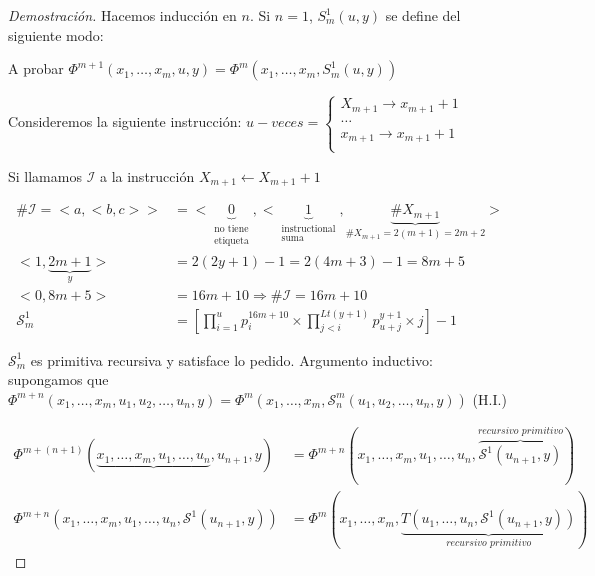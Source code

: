 \begin{proof}[Demostraci\'on]
Hacemos inducci\'on en $n$. Si $n = 1$, $S^{1}_{m}(u, y)$ se define del siguiente modo:

A probar $\Phi^{m + 1}(x_1, \ldots, x_m, u, y) = \Phi^{m}(x_1, \ldots, x_m, S^{1}_{m}(u, y))$

Consideremos la siguiente instrucci\'on:
\( u-veces =
\begin{cases}
X_{m + 1} \rightarrow x_{m + 1} + 1			\\
\ldots										\\
x_{m + 1} \rightarrow x_{m + 1} + 1			\\
\end{cases}
\)

Si llamamos $\mathcal{I}$ a la instrucci\'on $X_{m + 1} \leftarrow X_{m + 1} + 1$

\begin{align*}
\# \mathcal{I} = <a, <b, c>> &= <\underbrace{0}_{\substack{\text{no tiene} \\ \text{etiqueta}}}, <\underbrace{1}_{\substack{\text{instructional} \\ \text{suma}}}, \underbrace{\#X_{m + 1}}_{\#X_{m + 1} = 2(m+1) = 2m + 2}> 	\\
<1, \underbrace{2m + 1}_{y}> &= 2(2y + 1) - 1 = 2(4m + 3) - 1 = 8m + 5										\\
<0, 8m + 5> &= 16m + 10 \Rightarrow \#\mathcal{I} = 16m + 10												\\
\mathcal{S}^{1}_{m} &= \left[ \prod_{i = 1}^{u} p_{i}^{16 m + 10} \times \prod_{j < i}^{Lt(y + 1)}p_{u + j}^{y + 1} \times j \right] - 1
\end{align*}

$\mathcal{S}^{1}_{m}$ es primitiva recursiva y satisface lo pedido. Argumento inductivo: supongamos que $\Phi^{m + n}(x_1, \ldots, x_m, u_1, u_2, \ldots, u_n, y) = \Phi^{m}(x_1, \ldots, x_m, \mathcal{S}^{m}_{n}(u_1, u_2, \ldots, u_n, y))$ (H.I.)

\begin{align*}
\Phi^{m + (n + 1)}(\underbrace{x_1, \ldots, x_m, u_1, \ldots, u_n}_{}, u_{n + 1}, y) &= \Phi^{m + n}(x_1, \ldots, x_m, u_1, \ldots, u_n, \overbrace{\mathcal{S}^{1}(u_{n + 1}, y)}^{\textit{recursivo primitivo}}) \\
\Phi^{m + n}(x_1, \ldots, x_m, u_1, \ldots, u_n, \mathcal{S}^{1}(u_{n + 1}, y)) &= \Phi^{m}(x_1, \ldots, x_m, \underbrace{T(u_1, \ldots, u_n, \mathcal{S}^{1}(u_{n + 1}, y))}_{\textit{recursivo primitivo}})
\end{align*}

\end{proof}

